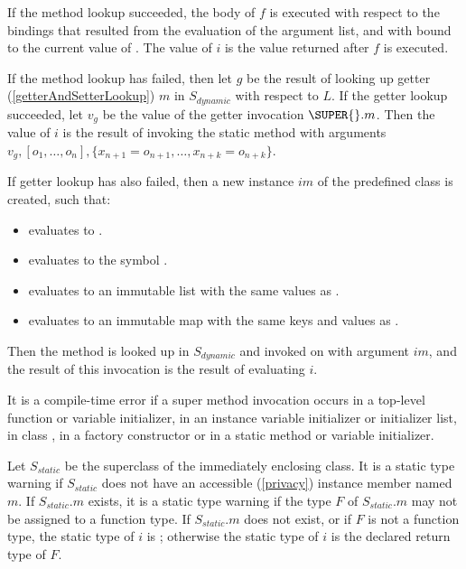 \documentclass{article}
\begin{document}
\LMHash{}
If the method lookup succeeded, the body of $f$ is executed with respect to the bindings that resulted from the evaluation of the argument list, and with \THIS{} bound to the current value of \THIS{}.
The value of $i$ is the value returned after $f$ is executed.

\LMHash{}
If the method lookup has failed, then let $g$ be the result of looking up getter (\ref{getterAndSetterLookup}) $m$ in $S_{dynamic}$ with respect to $L$.
If the getter lookup succeeded, let $v_g$ be the value of the getter invocation $\SUPER{}.m$.
Then the value of $i$ is the result of invoking the static method  with arguments $v_g, [o_1, \ldots , o_n], \{x_{n+1} = o_{n+1}, \ldots , x_{n+k} = o_{n+k}\}$.

\LMHash{}
If getter lookup has also failed, then a new instance $im$ of the predefined class  is created, such that:
\begin{itemize}
\item {} evaluates to \code{\TRUE{}}.
\item {} evaluates to the symbol .
\item {} evaluates to an immutable list with the same values as \code{[$o_1, \ldots, o_n$]}.
\item {} evaluates to an immutable map with the same keys and values as .
\end{itemize}
Then the method  is looked up in $S_{dynamic}$ and invoked on \THIS{} with argument $im$, and the result of this invocation is the result of evaluating $i$.

\LMHash{}
It is a compile-time error if a super method invocation occurs in a top-level function or variable initializer, in an instance variable initializer or initializer list, in class , in a factory constructor or in a static method or variable initializer.

\LMHash{}
Let $S_{static}$ be the superclass of the immediately enclosing class.
It is a static type warning if $S_{static}$ does not have an accessible (\ref{privacy}) instance member named $m$.
If $S_{static}.m$ exists, it is a static type warning if the type $F$ of $S_{static}.m$ may not be assigned to a function type.
If $S_{static}.m$ does not exist, or if $F$ is not a function type, the static type of $i$ is \DYNAMIC{}; otherwise the static type of $i$ is the declared return type of $F$.
\end{document}
